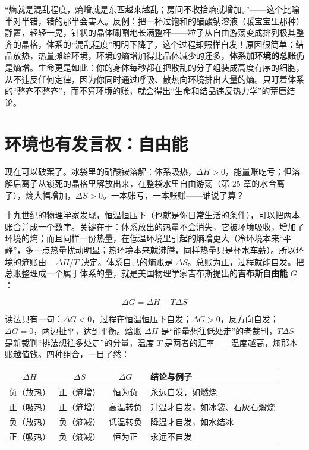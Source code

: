 \begin{wuqu}
“熵就是混乱程度，熵增就是东西越来越乱；房间不收拾熵就增加。”——这个比喻半对半错，错的那半会害人。反例：把一杯过饱和的醋酸钠溶液（暖宝宝里那种）静置，轻轻一晃，针状的晶体唰唰地长满整杯——粒子从自由游荡变成排列极其整齐的晶格，体系的“混乱程度”明明下降了，这个过程却照样自发！原因很简单：结晶放热，热量摊给环境，环境的熵增加得比晶体减少的还多，\textbf{体系加环境的总账}仍是熵增。生命更是如此：你的身体每秒都在把散乱的分子组装成高度有序的细胞，从不违反任何定律，因为你同时通过呼吸、散热向环境排出大量的熵。只盯着体系的“整齐不整齐”，而不算环境的账，就会得出“生命和结晶违反热力学”的荒唐结论。
\end{wuqu}

\section{环境也有发言权：自由能}

现在可以破案了。冰袋里的硝酸铵溶解：体系吸热，$\Delta H>0$，能量账吃亏；但溶解后离子从锁死的晶格里解放出来，在整袋水里自由游荡（第 25 章的水合离子），熵大幅增加，$\Delta S>0$。一本账亏，一本账赚——谁说了算？

十九世纪的物理学家发现，恒温恒压下（也就是你日常生活的条件），可以把两本账合并成一个数字。关键在于：体系放出的热量不会消失，它被环境吸收，增加了环境的熵；而且同样一份热量，在低温环境里引起的熵增更大（冷环境本来“平静”，多一点热量扰动明显；热环境本来就沸腾，同样热量只是杯水车薪）。所以环境的熵账由 $-\Delta H/T$ 决定。体系自己的熵账是 $\Delta S$。总账为正，过程就能自发。把总账整理成一个属于体系的量，就是美国物理学家吉布斯提出的\textbf{吉布斯自由能} $G$：

\[\Delta G = \Delta H - T\Delta S\]

读法只有一句：$\Delta G<0$，过程在恒温恒压下自发；$\Delta G>0$，反方向自发；$\Delta G=0$，两边扯平，达到平衡。焓账 $\Delta H$ 是“能量想往低处走”的老裁判，$T\Delta S$ 是新裁判“排法想往多处走”的分量，温度 $T$ 是两者的汇率——温度越高，熵那本账越值钱。四种组合，一目了然：

\begin{table}[h]
\centering
\begin{tabular}{cccl}
\toprule
$\Delta H$ & $\Delta S$ & $\Delta G$ & 结论与例子 \\
\midrule
负（放热） & 正（熵增） & 恒为负 & 永远自发，如燃烧 \\
正（吸热） & 正（熵增） & 高温转负 & 升温才自发，如冰袋、石灰石煅烧 \\
负（放热） & 负（熵减） & 低温转负 & 降温才自发，如水结冰 \\
正（吸热） & 负（熵减） & 恒为正 & 永远不自发 \\
\bottomrule
\end{tabular}
\end{table}

